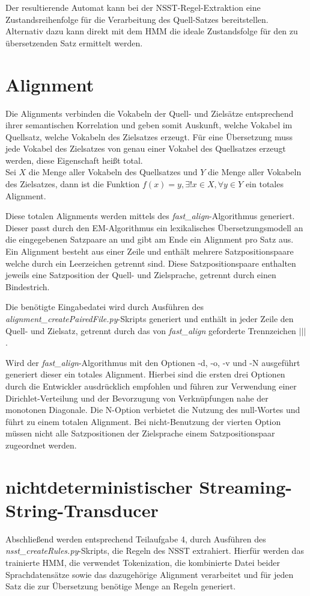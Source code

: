 \documentclass[conference]{IEEEtran}
\begin{document}
Der resultierende Automat kann bei der NSST-Regel-Extraktion eine Zustandsreihenfolge für die Verarbeitung des Quell-Satzes bereitstellen.
Alternativ dazu kann direkt mit dem HMM die ideale Zustandsfolge für den zu übersetzenden Satz ermittelt werden.

\section{Alignment}
Die Alignments verbinden die Vokabeln der Quell- und Zielsätze entsprechend ihrer semantischen Korrelation und geben somit Auskunft, welche Vokabel im Quellsatz, welche Vokabeln des Zielsatzes erzeugt. 
Für eine Übersetzung muss jede Vokabel des Zielsatzes von genau einer Vokabel des Quellsatzes erzeugt werden, diese Eigenschaft heißt total. \\
Sei $X$ die Menge aller Vokabeln des Quellsatzes und $Y$ die Menge aller Vokabeln des Zielsatzes, dann ist die Funktion $f(x) = y, \exists! x \in X, \forall y \in Y $ ein totales Alignment. 

Diese totalen Alignments werden mittels des \textit{fast\_align}-Algorithmus \cite{fast_align} generiert.
Dieser passt durch den EM-Algorithmus ein lexikalisches Übersetzungsmodell an die eingegebenen Satzpaare an \cite{fast_align} und gibt am Ende ein Alignment pro Satz aus.
Ein Alignment besteht aus einer Zeile und enthält mehrere Satzpositionspaare welche durch ein Leerzeichen getrennt sind.
Diese Satzpositionspaare enthalten jeweils eine Satzposition der Quell- und Zielsprache, getrennt durch einen Bindestrich.

Die benötigte Eingabedatei wird durch Ausführen des \textit{alignment\_createPairedFile.py}-Skripts generiert und enthält in jeder Zeile den Quell- und Zielsatz, getrennt durch das von \textit{fast\_align} geforderte Trennzeichen \glqq{} $ ||| $ \grqq .

Wird der \textit{fast\_align}-Algorithmus mit den Optionen -d, -o, -v und -N ausgeführt generiert dieser ein totales Alignment.
Hierbei sind die ersten drei Optionen durch die Entwickler ausdrücklich empfohlen und führen zur Verwendung einer Dirichlet-Verteilung und der Bevorzugung von Verknüpfungen nahe der monotonen Diagonale. 
Die N-Option verbietet die Nutzung des null-Wortes und führt zu einem totalen Alignment.
Bei nicht-Benutzung der vierten Option müssen nicht alle Satzpositionen der Zielsprache einem Satzpositionspaar zugeordnet werden.


\section{nichtdeterministischer Streaming-String-Transducer}
Abschließend werden entsprechend Teilaufgabe 4, durch Ausführen des \textit{nsst\_createRules.py}-Skripts, die Regeln des NSST extrahiert.
Hierfür werden das trainierte HMM, die verwendet Tokenization, die kombinierte Datei beider Sprachdatensätze sowie das dazugehörige Alignment verarbeitet und für jeden Satz die zur Übersetzung benötige Menge an Regeln generiert.
\end{document}

